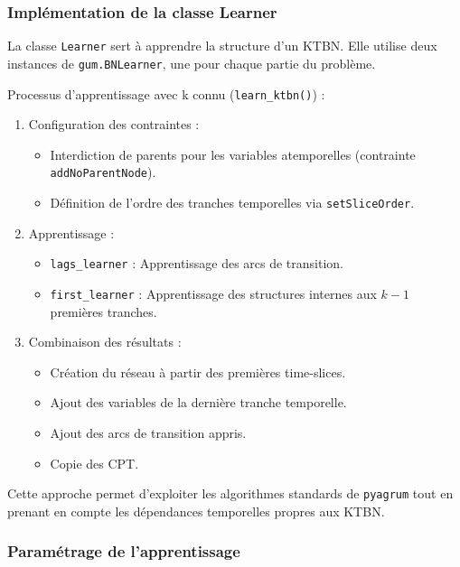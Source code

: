 \documentclass{article}
\begin{document}
\subsubsection{Implémentation de la classe Learner}

La classe \texttt{Learner} sert à apprendre la structure d'un KTBN. Elle utilise deux instances
de \texttt{gum.BNLearner}, une pour chaque partie du problème.

Processus d'apprentissage avec k connu (\texttt{learn\_ktbn()}) :

\begin{enumerate}
    \item Configuration des contraintes :
          \begin{itemize}
              \item Interdiction de parents pour les variables atemporelles (contrainte \texttt{addNoParentNode}).
              \item Définition de l'ordre des tranches temporelles via \texttt{setSliceOrder}.
          \end{itemize}
    \item Apprentissage :
          \begin{itemize}
              \item \texttt{lags\_learner} : Apprentissage des arcs de transition.
              \item \texttt{first\_learner} : Apprentissage des structures internes aux $k-1$ premières tranches.
          \end{itemize}
    \item Combinaison des résultats :
          \begin{itemize}
              \item Création du réseau à partir des premières time-slices.
              \item Ajout des variables de la dernière tranche temporelle.
              \item Ajout des arcs de transition appris.
              \item Copie des CPT.
          \end{itemize}
\end{enumerate}

Cette approche permet d'exploiter les algorithmes standards de \texttt{pyagrum} tout en prenant en compte les
dépendances temporelles propres aux KTBN.

\subsubsection{Paramétrage de l’apprentissage}
\end{document}
